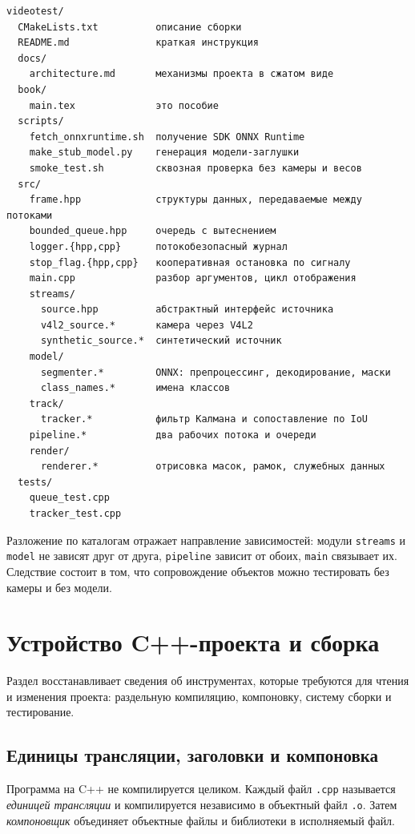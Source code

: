 \documentclass[11pt,a4paper]{article}
\theoremstyle{definition}
\theoremstyle{remark}
\begin{document}
\begin{lstlisting}[style=shell]
videotest/
  CMakeLists.txt          описание сборки
  README.md               краткая инструкция
  docs/
    architecture.md       механизмы проекта в сжатом виде
  book/
    main.tex              это пособие
  scripts/
    fetch_onnxruntime.sh  получение SDK ONNX Runtime
    make_stub_model.py    генерация модели-заглушки
    smoke_test.sh         сквозная проверка без камеры и весов
  src/
    frame.hpp             структуры данных, передаваемые между потоками
    bounded_queue.hpp     очередь с вытеснением
    logger.{hpp,cpp}      потокобезопасный журнал
    stop_flag.{hpp,cpp}   кооперативная остановка по сигналу
    main.cpp              разбор аргументов, цикл отображения
    streams/
      source.hpp          абстрактный интерфейс источника
      v4l2_source.*       камера через V4L2
      synthetic_source.*  синтетический источник
    model/
      segmenter.*         ONNX: препроцессинг, декодирование, маски
      class_names.*       имена классов
    track/
      tracker.*           фильтр Калмана и сопоставление по IoU
    pipeline.*            два рабочих потока и очереди
    render/
      renderer.*          отрисовка масок, рамок, служебных данных
  tests/
    queue_test.cpp
    tracker_test.cpp
\end{lstlisting}

Разложение по каталогам отражает направление зависимостей: модули
\texttt{streams} и \texttt{model} не зависят друг от друга, \texttt{pipeline}
зависит от обоих, \texttt{main} связывает их. Следствие состоит в том, что
сопровождение объектов можно тестировать без камеры и без модели.

\section{Устройство C++-проекта и сборка}
\label{sec:build}

Раздел восстанавливает сведения об инструментах, которые требуются для
чтения и изменения проекта: раздельную компиляцию, компоновку, систему
сборки и тестирование.

\subsection{Единицы трансляции, заголовки и компоновка}

Программа на C++ не компилируется целиком. Каждый файл \texttt{.cpp}
называется \emph{единицей трансляции} и компилируется независимо в объектный
файл \texttt{.o}. Затем \emph{компоновщик} объединяет объектные файлы и
библиотеки в исполняемый файл.
\end{document}
